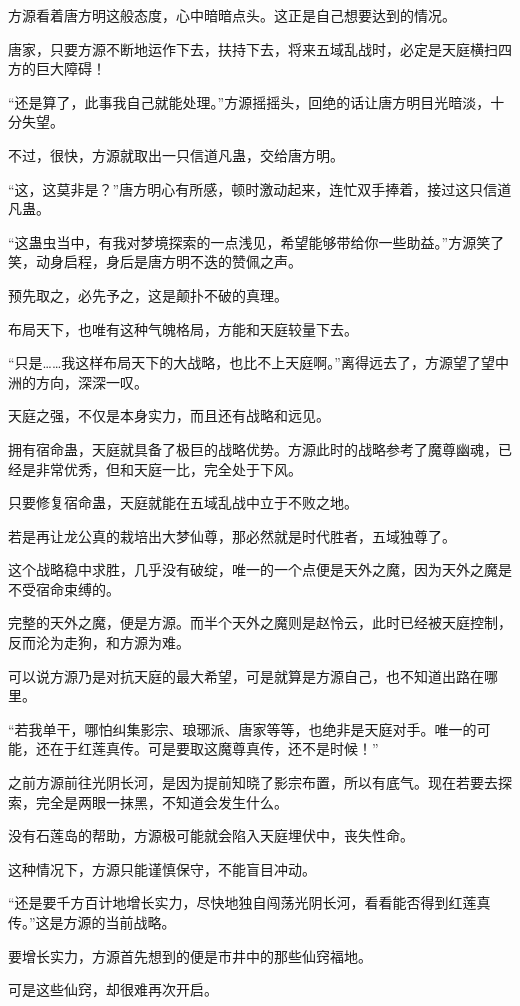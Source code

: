 \begin{this_body}
方源看着唐方明这般态度，心中暗暗点头。这正是自己想要达到的情况。

唐家，只要方源不断地运作下去，扶持下去，将来五域乱战时，必定是天庭横扫四方的巨大障碍！

“还是算了，此事我自己就能处理。”方源摇摇头，回绝的话让唐方明目光暗淡，十分失望。

不过，很快，方源就取出一只信道凡蛊，交给唐方明。

“这，这莫非是？”唐方明心有所感，顿时激动起来，连忙双手捧着，接过这只信道凡蛊。

“这蛊虫当中，有我对梦境探索的一点浅见，希望能够带给你一些助益。”方源笑了笑，动身启程，身后是唐方明不迭的赞佩之声。

预先取之，必先予之，这是颠扑不破的真理。

布局天下，也唯有这种气魄格局，方能和天庭较量下去。

“只是……我这样布局天下的大战略，也比不上天庭啊。”离得远去了，方源望了望中洲的方向，深深一叹。

天庭之强，不仅是本身实力，而且还有战略和远见。

拥有宿命蛊，天庭就具备了极巨的战略优势。方源此时的战略参考了魔尊幽魂，已经是非常优秀，但和天庭一比，完全处于下风。

只要修复宿命蛊，天庭就能在五域乱战中立于不败之地。

若是再让龙公真的栽培出大梦仙尊，那必然就是时代胜者，五域独尊了。

这个战略稳中求胜，几乎没有破绽，唯一的一个点便是天外之魔，因为天外之魔是不受宿命束缚的。

完整的天外之魔，便是方源。而半个天外之魔则是赵怜云，此时已经被天庭控制，反而沦为走狗，和方源为难。

可以说方源乃是对抗天庭的最大希望，可是就算是方源自己，也不知道出路在哪里。

“若我单干，哪怕纠集影宗、琅琊派、唐家等等，也绝非是天庭对手。唯一的可能，还在于红莲真传。可是要取这魔尊真传，还不是时候！”

之前方源前往光阴长河，是因为提前知晓了影宗布置，所以有底气。现在若要去探索，完全是两眼一抹黑，不知道会发生什么。

没有石莲岛的帮助，方源极可能就会陷入天庭埋伏中，丧失性命。

这种情况下，方源只能谨慎保守，不能盲目冲动。

“还是要千方百计地增长实力，尽快地独自闯荡光阴长河，看看能否得到红莲真传。”这是方源的当前战略。

要增长实力，方源首先想到的便是市井中的那些仙窍福地。

可是这些仙窍，却很难再次开启。


\end{this_body}
